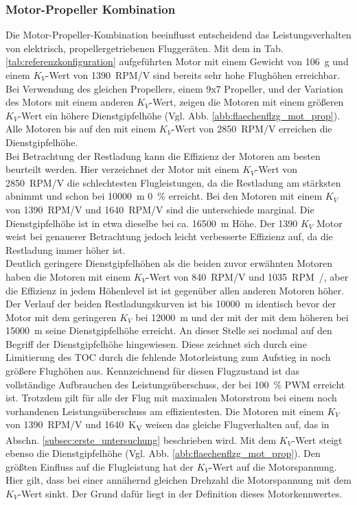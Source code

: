 \subsubsection{Motor-Propeller Kombination}
\label{subsubsec:mot_prop_kombi}
Die Motor-Propeller-Kombination beeinflusst entscheidend das Leistungsverhalten von elektrisch, propellergetriebenen Fluggeräten. Mit dem in Tab. \ref{tab:referenzkonfiguration} aufgeführten Motor mit einem Gewicht von \SI{106}{g} und einem \ensuremath{K_V}-Wert von \SI{1390}{RPM/V} sind bereits sehr hohe Flughöhen erreichbar. Bei Verwendung des gleichen Propellers, einem 9x7 Propeller, und der Variation des Motors mit einem anderen \ensuremath{K_V}-Wert, zeigen die Motoren mit einem größeren \ensuremath{K_V}-Wert ein höhere Dienstgipfelhöhe (Vgl. Abb. \ref{abb:flaechenflzg_mot_prop}). Alle Motoren bis auf den mit einem \ensuremath{K_V}-Wert von \SI{2850}{RPM/V}	erreichen die Dienstgipfelhöhe.\\
Bei Betrachtung der Restladung kann die Effizienz der Motoren am besten beurteilt werden. Hier verzeichnet der Motor mit einem \ensuremath{K_V}-Wert von \SI{2850}{RPM/V} die schlechtesten Flugleistungen, da die Restladung am stärksten abnimmt und schon bei \SI{10000}{m} \SI{0}{\%} erreicht. Bei den Motoren mit einem \ensuremath{K_V} von \SI{1390}{RPM/V} und \SI{1640}{RPM/V} sind die unterschiede marginal. Die Dienstgipfelhöhe ist in etwa dieselbe bei ca. \SI{16500}{m} Höhe. Der \SI{1390}{} \ensuremath{K_V} Motor weist bei genauerer Betrachtung jedoch leicht verbesserte Effizienz auf, da die Restladung immer höher ist. \\
Deutlich geringere Dienstgipfelhöhen als die beiden zuvor erwähnten Motoren haben die Motoren mit einem \ensuremath{K_V}-Wert von \SI{840}{RPM/V} und \SI{1035}{RPM/}, aber die Effizienz in jedem Höhenlevel ist ist gegenüber allen anderen Motoren höher. Der Verlauf der beiden Restladungskurven ist bis \SI{10000}{m} identisch bevor der Motor mit dem geringeren \ensuremath{K_V} bei \SI{12000}{m} und der mit der mit dem höheren bei \SI{15000}{m} seine Dienstgipfelhöhe erreicht. 
An dieser Stelle sei nochmal auf den Begriff der Dienstgipfelhöhe hingewiesen. Diese zeichnet sich durch eine Limitierung des TOC durch die fehlende Motorleistung zum Aufstieg in noch größere Flughöhen aus. Kennzeichnend für diesen Flugzustand ist das vollständige Aufbrauchen des Leistungsüberschuss, der bei \SI{100}{\%} PWM erreicht ist. Trotzdem gilt für alle der Flug mit maximalen Motorstrom bei einem noch vorhandenen Leistungsüberschuss am effizientesten.
Die Motoren mit einem \ensuremath{K_V} von \SI{1390}{RPM/V} und \SI{1640}{K_V} weisen das gleiche Flugverhalten auf, das in Abschn. \ref{subsec:erste_untersuchung} beschrieben wird.
Mit dem \ensuremath{K_V}-Wert steigt ebenso die Dienstgipfelhöhe (Vgl. Abb. \ref{abb:flaechenflzg_mot_prop}). Den größten Einfluss auf die Flugleistung hat der \ensuremath{K_V}-Wert auf die Motorspannung. Hier gilt, dass bei einer annähernd gleichen Drehzahl die Motorspannung mit dem \ensuremath{K_V}-Wert sinkt. Der Grund dafür liegt in der Definition dieses Motorkennwertes.\\

